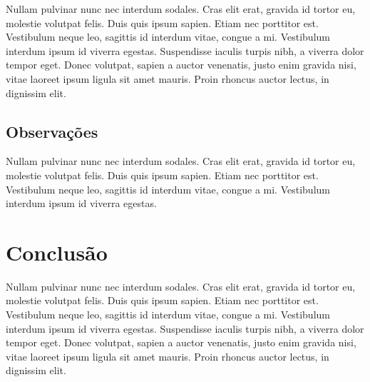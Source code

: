 \documentclass[10pt,twocolumn,letterpaper]{article}
\begin{document}
Nullam pulvinar nunc nec interdum sodales. Cras elit erat, gravida id tortor eu, molestie volutpat felis. Duis quis ipsum sapien. Etiam nec porttitor est. Vestibulum neque leo, sagittis id interdum vitae, congue a mi. Vestibulum interdum ipsum id viverra egestas. Suspendisse iaculis turpis nibh, a viverra dolor tempor eget. Donec volutpat, sapien a auctor venenatis, justo enim gravida nisi, vitae laoreet ipsum ligula sit amet mauris. Proin rhoncus auctor lectus, in dignissim elit.

\subsection{Observações}
Nullam pulvinar nunc nec interdum sodales. Cras elit erat, gravida id tortor eu, molestie volutpat felis. Duis quis ipsum sapien. Etiam nec porttitor est. Vestibulum neque leo, sagittis id interdum vitae, congue a mi. Vestibulum interdum ipsum id viverra egestas.

\section{Conclusão}

Nullam pulvinar nunc nec interdum sodales. Cras elit erat, gravida id tortor eu, molestie volutpat felis. Duis quis ipsum sapien. Etiam nec porttitor est. Vestibulum neque leo, sagittis id interdum vitae, congue a mi. Vestibulum interdum ipsum id viverra egestas. Suspendisse iaculis turpis nibh, a viverra dolor tempor eget. Donec volutpat, sapien a auctor venenatis, justo enim gravida nisi, vitae laoreet ipsum ligula sit amet mauris. Proin rhoncus auctor lectus, in dignissim elit.

{\small


}
\end{document}
